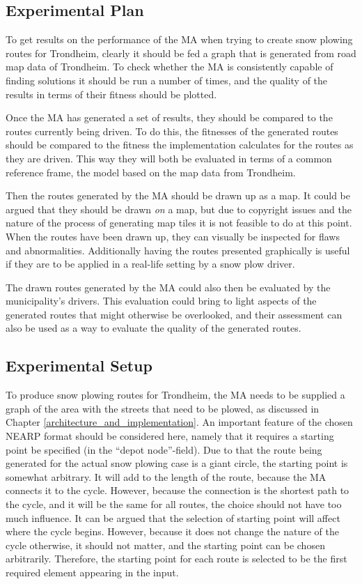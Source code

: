 \subsection{Experimental Plan}

To get results on the performance of the MA when trying to create snow plowing routes for Trondheim, clearly it should be fed a graph that is generated from road map data of Trondheim. To check whether the MA is consistently capable of finding solutions it should be run a number of times, and the quality of the results in terms of their fitness should be plotted.

Once the MA has generated a set of results, they should be compared to the routes currently being driven. To do this, the fitnesses of the generated routes should be compared to the fitness the implementation calculates for the routes as they are driven. This way they will both be evaluated in terms of a common reference frame, the model based on the map data from Trondheim.

Then the routes generated by the MA should be drawn up as a map. It could be argued that they should be drawn \emph{on} a map, but due to copyright issues and the nature of the process of generating map tiles it is not feasible to do at this point. When the routes have been drawn up, they can visually be inspected for flaws and abnormalities. Additionally having the routes presented graphically is useful if they are to be applied in a real-life setting by a snow plow driver.

The drawn routes generated by the MA could also then be evaluated by the municipality's drivers. This evaluation could bring to light aspects of the generated routes that might otherwise be overlooked, and their assessment can also be used as a way to evaluate the quality of the generated routes.

\subsection{Experimental Setup}

To produce snow plowing routes for Trondheim, the MA needs to be supplied a graph of the area with the streets that need to be plowed, as discussed in Chapter \ref{architecture_and_implementation}. An important feature of the chosen NEARP format should be considered here, namely that it requires a starting point be specified (in the \enquote{depot node}-field). Due to that the route being generated for the actual snow plowing case is a giant circle, the starting point is somewhat arbitrary. It will add to the length of the route, because the MA connects it to the cycle. However, because the connection is the shortest path to the cycle, and it will be the same for all routes, the choice should not have too much influence. It can be argued that the selection of starting point will affect where the cycle begins. However, because it does not change the nature of the cycle otherwise, it should not matter, and the starting point can be chosen arbitrarily. Therefore, the starting point for each route is selected to be the first required element appearing in the input.

